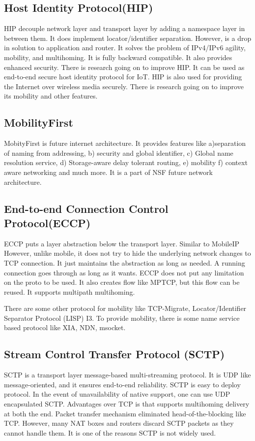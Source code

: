 \subsection{Host Identity Protocol(HIP)}
HIP\cite{HIP} decouple network layer and transport layer by adding a namespace layer in between them. It does implement locator/identifier separation. However, is a drop in solution to application and router. It solves the problem of IPv4/IPv6 agility, mobility, and multihoming. It is fully backward compatible. It also provides enhanced security. There is research going on to improve HIP. It can be used as end-to-end secure host identity protocol for IoT\cite{HIPIoT}. HIP is also used for providing the Internet over wireless media securely\cite{HIPPubliceWifi}. There is research going on to improve its mobility and other features\cite{HIPMobility,HIPMobilityEnhanced,HIPMobilitySimulte}.

\subsection{MobilityFirst}
MobityFirst is future internet architecture. It provides features like a)separation of naming from addressing, b) security and global identifier, c) Global name resolution service, d) Storage-aware delay tolerant routing, e) mobility f) context aware networking\cite{MobilityFirstContextAwareDemo} and much more. It is a part of NSF future network architecture.


\subsection{End-to-end Connection Control Protocol(ECCP)}
ECCP\cite{ECCP} puts a layer abstraction below the transport layer. Similar to MobileIP However, unlike mobile, it does not try to hide the underlying network changes to TCP connection. It just maintains the abstraction as long as needed. A running connection goes through as long as it wants. ECCP does not put any limitation on the proto to be used. It also creates flow like MPTCP, but this flow can be reused. It supports multipath multihoming. 

There are some other protocol for mobility like TCP-Migrate, Locator/Identifier Separator Protocol (LISP)\cite{LISPRFC6830} I3\cite{I3-internet-indirection-infrastructure}. To provide mobility, there is some name service based protocol like XIA\cite{XIA}, NDN\cite{ndn}, msocket\cite{Yadav2016}.

\subsection{Stream Control Transfer Protocol (SCTP)}
SCTP\cite{RFC4960} is a transport layer message-based multi-streaming protocol. It is UDP like message-oriented, and it ensures end-to-end reliability. SCTP is easy to deploy protocol. In the event of unavailability of native support, one can use UDP encapsulated SCTP\cite{RFC6951}. Advantages over TCP is that supports multihoming delivery at both the end. Packet transfer mechanism eliminated head-of-the-blocking like TCP. However, many NAT boxes and routers discard SCTP packets as they cannot handle them. It is one of the reasons SCTP is not widely used.

